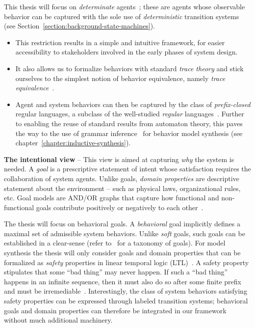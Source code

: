 This thesis will focus on \emph{determinate} agents~\cite{Engelfriet:1985}; these are agents whose observable behavior can be captured with the sole use of \emph{deterministic} transition systems (see Section~\ref{section:background-state-machines}).
\begin{itemize} 
\item This restriction results in a simple and intuitive framework, for easier accessibility to stakeholders involved in the early phases of system design. 
\item It also allows us to formalize behaviors with standard \emph{trace theory} \cite{Hoare:1985} and stick ourselves to the simplest notion of behavior equivalence, namely \emph{trace equivalence}~\cite{Engelfriet:1985}. 
\item Agent and system behaviors can then be captured by the class of \emph{prefix-closed} regular languages, a subclass of the well-studied \emph{regular} languages~\cite{Hopcroft:1979, Aho:1986}. Further to enabling the reuse of standard results from automaton theory, this paves the way to the use of grammar inference~\cite{Gold:1978} for behavior model synthesis (see chapter~\ref{chapter:inductive-synthesis}). 
\end{itemize}


\noindent \textbf{The intentional view} -- This view is aimed at capturing \emph{why} the system is needed. A \emph{goal} is a prescriptive statement of intent whose satisfaction requires the collaboration of system agents. Unlike goals, \emph{domain properties} are descriptive statement about the environment -- such as physical laws, organizational rules, etc. Goal models are AND/OR graphs that capture how functional and non-functional goals contribute positively or negatively to each other~\cite{VanLamsweerde:2000, VanLamsweerde:2004}.

The thesis will focus on behavioral goals. A \emph{behavioral} goal implicitly defines a maximal set of admissible system behaviors. Unlike \emph{soft} goals, such goals can be established in a clear-sense (refer to~\cite{VanLamsweerde:2009} for a taxonomy of goals). For model synthesis the thesis will only consider goals and domain properties that can be formalized as \emph{safety} properties in linear temporal logic (LTL)~\cite{Manna:1992}. A safety property stipulates that some ``bad thing'' may never happen. If such a ``bad thing'' happens in an infinite sequence, then it must also do so after some finite prefix and must be irremediable~\cite{Alpern:1986, Giannakopoulou:1999}. Interestingly, the class of system behaviors satisfying safety properties can be expressed through labeled transition systems; behavioral goals and domain properties can therefore be integrated in our framework without much additional machinery.

